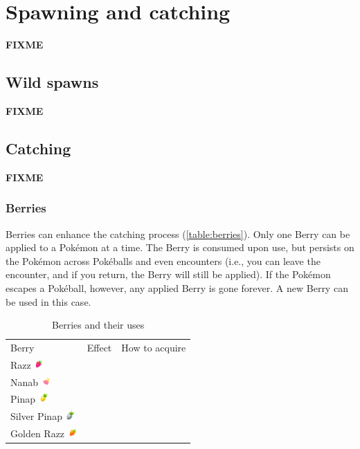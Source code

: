 \chapter{Spawning and catching}
\label{chap:spawn}
\textbf{FIXME}

\section{Wild spawns}
\label{sec:spawns}
\textbf{FIXME}

\section{Catching}
\label{sec:catch}
\textbf{FIXME}

\subsection{Berries}
Berries can enhance the catching process (\autoref{table:berries}).
Only one Berry can be applied to a Pokémon at a time.
The Berry is consumed upon use, but persists on the Pokémon across Pokéballs
  and even encounters (i.e., you can leave the encounter, and if you return,
  the Berry will still be applied).
If the Pokémon escapes a Pokéball, however, any applied Berry is gone forever.
A new Berry can be used in this case.

\begin{table}[ht]
\begin{center}
\begin{tabular}{lll}
Berry & Effect & How to acquire \\
\Midrule
Razz \includegraphics[width=1em]{images/razz.png} & & \\
Nanab \includegraphics[width=1em]{images/nanab.png} & & \\
Pinap \includegraphics[width=1em]{images/pinap.png} & & \\
Silver Pinap \includegraphics[width=1em]{images/silverpinap.png} & &\\
Golden Razz \includegraphics[width=1em]{images/goldenrazz.png} & & \\
\end{tabular}
\end{center}
\caption{Berries and their uses}
\label{table:berries}
\end{table}

